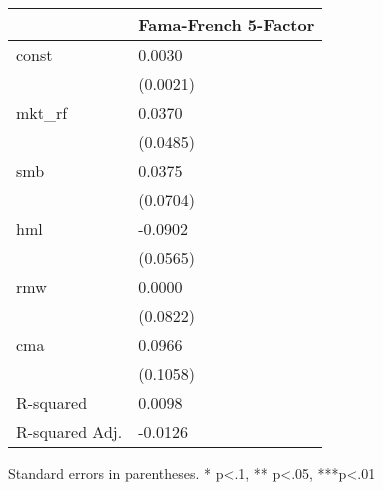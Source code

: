 \begin{table}
\caption{}
\label{}
\begin{center}
\begin{tabular}{ll}
\hline
               & Fama-French 5-Factor  \\
\hline
const          & 0.0030                \\
               & (0.0021)              \\
mkt\_rf        & 0.0370                \\
               & (0.0485)              \\
smb            & 0.0375                \\
               & (0.0704)              \\
hml            & -0.0902               \\
               & (0.0565)              \\
rmw            & 0.0000                \\
               & (0.0822)              \\
cma            & 0.0966                \\
               & (0.1058)              \\
R-squared      & 0.0098                \\
R-squared Adj. & -0.0126               \\
\hline
\end{tabular}
\end{center}
\end{table}
\bigskip
Standard errors in parentheses. \newline 
* p<.1, ** p<.05, ***p<.01